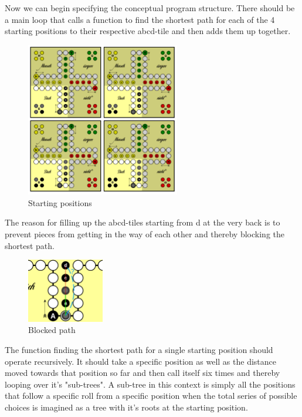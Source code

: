 \documentclass[12pt]{article} %
\begin{document}
Now we can begin specifying the conceptual program structure.
There should be a main loop that calls a function to find the shortest path for each of the 4 starting positions to their respective abcd-tile and then adds them up together.

\begin{figure}[htbp]
    \centering
    \includegraphics[width=0.6\textwidth]{images/Figure3}
    \caption{Starting positions}
    \label{fig:startpos}
\end{figure}

The reason for filling up the abcd-tiles starting from d at the very back is to prevent pieces from getting in the way of each other and thereby blocking the shortest path.

\begin{figure}[htbp]
    \centering
    \includegraphics[width=0.3\textwidth]{images/Figure4}
    \caption{Blocked path}
    \label{fig:blockedpath}
\end{figure}

\newpage

The function finding the shortest path for a single starting position should operate recursively. It should take a specific position as well as the distance moved towards that position so far and then call itself six times and thereby looping over it's "sub-trees".
A sub-tree in this context is simply all the positions that follow a specific roll from a specific position when the total series of possible choices is imagined as a tree with it's roots at the starting position.
\end{document}
